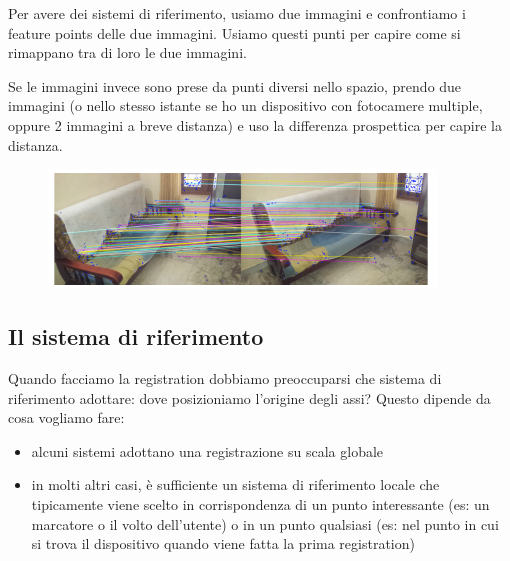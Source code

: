 Per avere dei sistemi di riferimento, usiamo due immagini e confrontiamo i feature points delle due immagini. Usiamo questi punti per capire come si rimappano tra di loro le due immagini.

Se le immagini invece sono prese da punti diversi nello spazio, prendo due immagini (o nello stesso istante se ho un dispositivo con fotocamere multiple, oppure 2 immagini a breve distanza) e uso la differenza prospettica per capire la distanza. 
\begin{figure}[!ht]
    \centering
    \includegraphics[width=\textwidth]{images/MobiDEV/3. augmented reality/markerless.PNG}
\end{figure}

\subsection{Il sistema di riferimento}
Quando facciamo la registration dobbiamo preoccuparsi che sistema di riferimento adottare: dove posizioniamo l'origine degli assi?
Questo dipende da cosa vogliamo fare:
\begin{itemize}
    \item alcuni sistemi adottano una registrazione su scala globale 
    \item in molti altri casi, è sufficiente un sistema di riferimento locale che tipicamente viene scelto in corrispondenza di un punto interessante (es: un marcatore o il volto dell'utente) o in un punto qualsiasi (es: nel punto in cui si trova il dispositivo quando viene fatta la prima registration)
\end{itemize}
